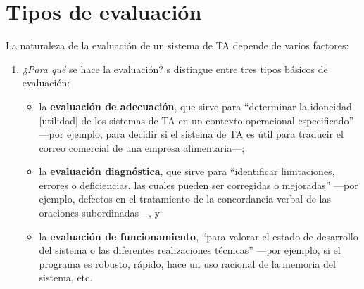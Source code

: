 \section{Tipos de evaluación} \label{ss:tipusaval} La naturaleza de la evaluación de un sistema de TA depende de varios factores: \begin{enumerate} \item \emph{¿Para qué} se hace la evaluación? s\citet{hutchins96u} distingue entre tres tipos básicos de evaluación: \begin{itemize} \item la \textbf{evaluación de adecuación}, que sirve para ``determinar la idoneidad [utilidad] de los sistemas de TA en un contexto operacional especificado'' ---por ejemplo, para decidir si el sistema de TA es útil para traducir el correo comercial de una empresa alimentaria---; \item la \textbf{evaluación diagnóstica}, que sirve para ``identificar limitaciones, errores o deficiencias, las cuales pueden ser corregidas o mejoradas'' ---por ejemplo, defectos en el tratamiento de la concordancia verbal de las oraciones subordinadas---, y \item la  \textbf{evaluación de funcionamiento}, ``para valorar el estado de desarrollo del sistema o las diferentes realizaciones técnicas'' ---por ejemplo, si el programa es robusto, rápido, hace un uso racional de la memoria del sistema, etc. \end{itemize} 


\end{enumerate}
